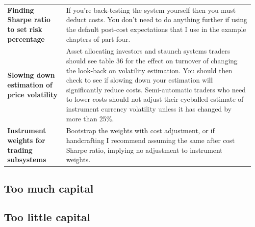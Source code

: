 {\begin{tabularx}{\textwidth}{@{} p{} Y@{}}
\textbf{Finding Sharpe ratio to set risk percentage} & If you're back-testing the system yourself then you must deduct costs. You don't need to do anything further if using the default post-cost expectations that I use in the example chapters of part four. \\
\textbf{Slowing down estimation of price volatility} & Asset allocating investors and staunch systems traders should see table 36 for the effect on turnover of changing the look-back on volatility estimation. You should then check to see if slowing down your estimation will significantly reduce costs. Semi-automatic traders who need to lower costs should not adjust their eyeballed estimate of instrument currency volatility unless it has changed by more than 25\%. \\
\textbf{Instrument weights for trading subsystems} & Bootstrap the weights with cost adjustment, or if handcrafting I recommend assuming the same after cost Sharpe ratio, implying no adjustment to instrument weights. \\
\end{tabularx}
}

\subsection*{Too much capital}


\subsection*{Too little capital}

